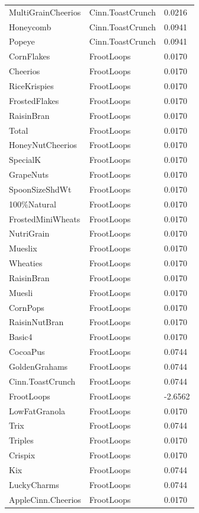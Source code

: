 \begin{table}[!htbp]
\begin{tabular}{lll}
\\
MultiGrainCheerios & Cinn.ToastCrunch & 0.0216
\\
Honeycomb & Cinn.ToastCrunch & 0.0941
\\
Popeye & Cinn.ToastCrunch & 0.0941
\\
CornFlakes & FrootLoops & 0.0170
\\
Cheerios & FrootLoops & 0.0170
\\
RiceKrispies & FrootLoops & 0.0170
\\
FrostedFlakes & FrootLoops & 0.0170
\\
RaisinBran & FrootLoops & 0.0170
\\
Total & FrootLoops & 0.0170
\\
HoneyNutCheerios & FrootLoops & 0.0170
\\
SpecialK & FrootLoops & 0.0170
\\
GrapeNuts & FrootLoops & 0.0170
\\
SpoonSizeShdWt & FrootLoops & 0.0170
\\
100\%Natural & FrootLoops & 0.0170
\\
FrostedMiniWheats & FrootLoops & 0.0170
\\
NutriGrain & FrootLoops & 0.0170
\\
Mueslix & FrootLoops & 0.0170
\\
Wheaties & FrootLoops & 0.0170
\\
RaisinBran & FrootLoops & 0.0170
\\
Muesli & FrootLoops & 0.0170
\\
CornPops & FrootLoops & 0.0170
\\
RaisinNutBran & FrootLoops & 0.0170
\\
Basic4 & FrootLoops & 0.0170
\\
CocoaPus & FrootLoops & 0.0744
\\
GoldenGrahams & FrootLoops & 0.0744
\\
Cinn.ToastCrunch & FrootLoops & 0.0744
\\
FrootLoops & FrootLoops & -2.6562
\\
LowFatGranola & FrootLoops & 0.0170
\\
Trix & FrootLoops & 0.0744
\\
Triples & FrootLoops & 0.0170
\\
Crispix & FrootLoops & 0.0170
\\
Kix & FrootLoops & 0.0744
\\
LuckyCharms & FrootLoops & 0.0744
\\
AppleCinn.Cheerios & FrootLoops & 0.0170

\end{tabular}
\end{table}
